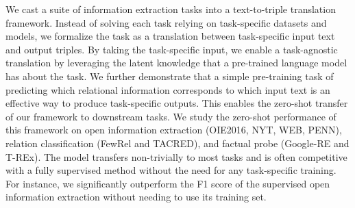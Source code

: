 We cast a suite of information extraction tasks into a text-to-triple translation framework. Instead of solving each task relying on task-specific datasets and models, we formalize the task as a translation between task-specific input text and output triples. By taking the task-specific input, we enable a task-agnostic translation by leveraging the latent knowledge that a pre-trained language model has about the task. We further demonstrate that a simple pre-training task of predicting which relational information corresponds to which input text is an effective way to produce task-specific outputs. This enables the zero-shot transfer of our framework to downstream tasks. We study the zero-shot performance of this framework on open information extraction (OIE2016, NYT, WEB, PENN), relation classification (FewRel and TACRED), and factual probe (Google-RE and T-REx). The model transfers non-trivially to most tasks and is often competitive with a fully supervised method without the need for any task-specific training. For instance, we significantly outperform the F1 score of the supervised open information extraction without needing to use its training set.
